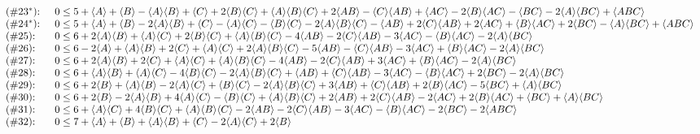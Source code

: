 {\begin{align*}
{\begin{array}{ll}
 \text{($\#$} 23^* \text{):  } & 0\leq 5+\expec{A}+\expec{B}-\expec{A} \expec{B}+\expec{C}+2 \expec{B} \expec{C}+\expec{A} \expec{B}
   \expec{C}+2 \expec{AB}-\expec{C} \expec{AB}+\expec{AC}-2 \expec{B} \expec{AC}-\expec{BC}-2 \expec{A} \expec{BC}+\expec{ABC} \\
 \text{($\#$} 24^* \text{):  } & 0\leq 5+\expec{A}+\expec{B}-2 \expec{A} \expec{B}+\expec{C}-\expec{A} \expec{C}-\expec{B} \expec{C}-2
   \expec{A} \expec{B} \expec{C}-\expec{AB}+2 \expec{C} \expec{AB}+2 \expec{AC}+\expec{B} \expec{AC}+2 \expec{BC}-\expec{A}
   \expec{BC}+\expec{ABC} \\
 \text{($\#$} 25 \text{):  } & 0\leq 6+2 \expec{A} \expec{B}+\expec{A} \expec{C}+2 \expec{B} \expec{C}+\expec{A} \expec{B} \expec{C}-4
   \expec{AB}-2 \expec{C} \expec{AB}-3 \expec{AC}-\expec{B} \expec{AC}-2 \expec{A} \expec{BC} \\
 \text{($\#$} 26 \text{):  } & 0\leq 6-2 \expec{A}+\expec{A} \expec{B}+2 \expec{C}+\expec{A} \expec{C}+2 \expec{A} \expec{B}
   \expec{C}-5 \expec{AB}-\expec{C} \expec{AB}-3 \expec{AC}+\expec{B} \expec{AC}-2 \expec{A} \expec{BC} \\
 \text{($\#$} 27 \text{):  } & 0\leq 6+2 \expec{A} \expec{B}+2 \expec{C}+\expec{A} \expec{C}+\expec{A} \expec{B} \expec{C}-4
   \expec{AB}-2 \expec{C} \expec{AB}+3 \expec{AC}+\expec{B} \expec{AC}-2 \expec{A} \expec{BC} \\
 \text{($\#$} 28 \text{):  } & 0\leq 6+\expec{A} \expec{B}+\expec{A} \expec{C}-4 \expec{B} \expec{C}-2 \expec{A} \expec{B}
   \expec{C}+\expec{AB}+\expec{C} \expec{AB}-3 \expec{AC}-\expec{B} \expec{AC}+2 \expec{BC}-2 \expec{A} \expec{BC} \\
 \text{($\#$} 29 \text{):  } & 0\leq 6+2 \expec{B}+\expec{A} \expec{B}-2 \expec{A} \expec{C}+\expec{B} \expec{C}-2 \expec{A} \expec{B}
   \expec{C}+3 \expec{AB}+\expec{C} \expec{AB}+2 \expec{B} \expec{AC}-5 \expec{BC}+\expec{A} \expec{BC} \\
 \text{($\#$} 30 \text{):  } & 0\leq 6+2 \expec{B}-2 \expec{A} \expec{B}+4 \expec{A} \expec{C}-\expec{B} \expec{C}+\expec{A} \expec{B}
   \expec{C}+2 \expec{AB}+2 \expec{C} \expec{AB}-2 \expec{AC}+2 \expec{B} \expec{AC}+\expec{BC}+\expec{A} \expec{BC} \\
 \text{($\#$} 31 \text{):  } & 0\leq 6+\expec{A} \expec{C}+4 \expec{B} \expec{C}+\expec{A} \expec{B} \expec{C}-2 \expec{AB}-2 \expec{C}
   \expec{AB}-3 \expec{AC}-\expec{B} \expec{AC}-2 \expec{BC}-2 \expec{ABC} \\
 \text{($\#$} 32 \text{):  } & 0\leq 7+\expec{A}+\expec{B}+\expec{A} \expec{B}+\expec{C}-2 \expec{A} \expec{C}+2 \expec{B}

\end{array}}
\end{align*}}
